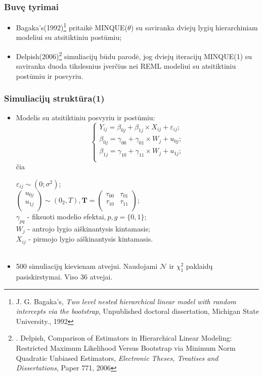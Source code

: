 \documentclass[utf8,hyperref={unicode,pdftex}]{beamer}
\begin{document}
\begin{frame}
\frametitle{Buvę tyrimai}
\begin{itemize}
\item Bagaka's(1992)\footnote{ J. G. Bagaka's,  \textit{ Two level nested hierarchical linear model with random intercepts
via the bootstrap}, Unpublished doctoral dissertation, Michigan State University., 1992} pritaikė MINQUE($\theta$) su saviranka dviejų lygių hierarchiniam modeliui su atsitiktiniu postūmiu;
\item Delpish(2006)\footnote{. Delpish, Comparison of Estimators in Hierarchical Linear Modeling: Restricted Maximum Likelihood Versus Bootstrap via Minimum Norm Quadratic Unbiased Estimators, \textit{Electronic Theses, Treatises and Dissertations}, Paper 771, 2006} simuliacijų būdu parodė, jog dviejų iteracijų MINQUE(1) su saviranka duoda tikslesnius įverčius nei REML modeliui su atsitiktiniu postūmiu ir posvyriu.
\end{itemize}
\end{frame}
\begin{frame}
\frametitle{Simuliacijų struktūra(1)}
\begin{itemize}
\item Modelis su atsitiktiniu posvyriu ir postūmiu:
\begin{equation*} \label{eq:2lvldelpish}
\left\{
\begin{array}{l}
Y_{ij} = \beta_{0j}+ \beta_{1j}\times X_{ij}+\varepsilon_{ij}; \\
\beta_{0j} = \gamma_{00} +\gamma_{01}\times W_{j}+u_{0j};\\
\beta_{1j} = \gamma_{10} +\gamma_{11}\times W_{j}+u_{1j};\\
\end{array} \right.
\end{equation*}
čia \\
\begin{small}
$\varepsilon_{ij}\sim \left(0;\sigma^2\right)$;\\
$\begin{pmatrix}
u_{0j} \\
u_{1j} \\
\end{pmatrix}\sim \left(0_2, T\right), \mathbf{T}=\begin{pmatrix}
\tau_{00} & \tau_{01} \\
\tau_{10} & \tau_{11} \\
\end{pmatrix}$; \\
$\gamma_{pq}$ - fiksuoti modelio efektai,$\ p,g = \{0,1\}$;\\
$W_j$ - antrojo lygio aiškinantysis kintamasis;\\
$X_{ij}$ - pirmojo lygio aiškinantysis kintamasis.\\ 
\ \\
\end{small}
\item 500 simuliacijų kievienam atvejui. Naudojami $\mathcal{N}$ ir $\chi^2_1$ paklaidų pasiskirstymai. Viso 36 atvejai.
\end{itemize}
\end{frame}
\end{document}
